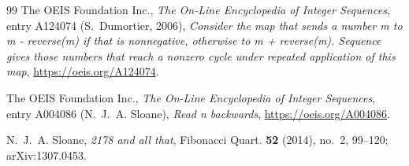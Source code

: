 \documentclass[11pt]{amsart}
\theoremstyle{plain}
\theoremstyle{definition}
\begin{document}
\begin{thebibliography}{99}
The OEIS Foundation Inc., \emph{The On-Line Encyclopedia of Integer Sequences}, entry A124074 (S.~Dumortier, 2006), \emph{Consider the map that sends a number m to m - reverse(m) if that is nonnegative, otherwise to m + reverse(m). Sequence gives those numbers that reach a nonzero cycle under repeated application of this map}, \url{https://oeis.org/A124074}.

The OEIS Foundation Inc., \emph{The On-Line Encyclopedia of Integer Sequences}, entry A004086 (N.~J.~A. Sloane), \emph{Read n backwards}, \url{https://oeis.org/A004086}.

N.~J.~A. Sloane, \emph{2178 and all that}, Fibonacci Quart. \textbf{52} (2014), no.~2, 99--120; arXiv:1307.0453.

\end{thebibliography}
\end{document}
